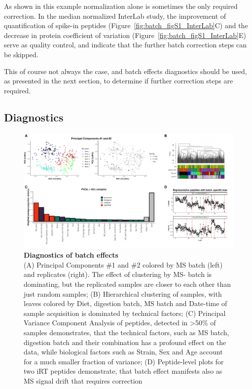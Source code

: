 \documentclass[num-refs]{wiley-article}
\begin{document}
As shown in this example normalization alone is sometimes the only required correction. In the median normalized InterLab study, the improvement of quantification of spike-in peptides (Figure~\ref{fig:batch_figS1_InterLab}C) and the decrease in protein coefficient of variation (Figure~\ref{fig:batch_figS1_InterLab}E) serve as quality control, and indicate that the further batch correction steps can be skipped.

This of course not always the case, and batch effects diagnostics should be used, as presented in the next section, to determine if further correction steps are required.


\subsection{Diagnostics}

\begin{figure}[hbt]
	\includegraphics[width=\textwidth]{figures/Fig2_diagnostics.pdf}
	
	\caption{\textbf{Diagnostics of batch effects}  \\
		\footnotesize
		(A) Principal Components \#1 and \#2 colored by MS batch (left) and replicates (right). The effect of clustering by MS- batch is dominating, but the replicated samples are closer to each other than just random samples; (B) Hierarchical clustering of samples, with leaves colored by Diet, digestion batch, MS batch and Date-time of sample acquisition is dominated by technical factors; (C) Principal Variance Component Analysis of peptides, detected in >50\% of samples demonstrates, that the technical factors, such as MS batch, digestion batch and their combination has a profound effect on the data, while biological factors such as Strain, Sex and Age account for a much smaller fraction of variance; (D) Peptide-level plots for two iRT peptides demonstrate, that batch effect manifests also as MS signal drift that requires correction}
	\label{fig:batch_fig3_diagnostics}
\end{figure}
\end{document}

